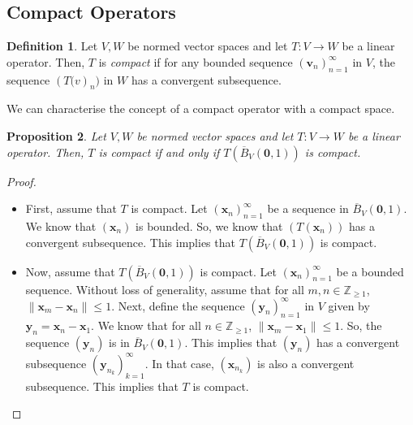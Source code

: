 \documentclass[a4paper, openany]{memoir}
\theoremstyle{definition}
\newtheorem{definition}{Definition}[section]
\theoremstyle{plain}
\newtheorem{proposition}[definition]{Proposition}
\begin{document}
    \subsection{Compact Operators}
    \begin{definition}
        Let $V, W$ be normed vector spaces and let $T: V \to W$ be a linear operator. Then, $T$ is \emph{compact} if for any bounded sequence $(\bm{v}_n)_{n=1}^\infty$ in $V$, the sequence $(T\bm(v)_n)$ in $W$ has a convergent subsequence.
    \end{definition}
    \noindent We can characterise the concept of a compact operator with a compact space.
    \begin{proposition}
        Let $V, W$ be normed vector spaces and let $T: V \to W$ be a linear operator. Then, $T$ is compact if and only if $T(\overline{B}_V(\bm{0}, 1))$ is compact.
    \end{proposition}
    \begin{proof}
        \hspace*{0pt}
        \begin{itemize}
            \item First, assume that $T$ is compact. Let $(\bm{x}_n)_{n=1}^\infty$ be a sequence in $\overline{B}_V(\bm{0}, 1)$. We know that $(\bm{x}_n)$ is bounded. So, we know that $(T(\bm{x}_n))$ has a convergent subsequence. This implies that $T(\overline{B}_V(\bm{0}, 1))$ is compact.
            
            \item Now, assume that $T(\overline{B}_V(\bm{0}, 1))$ is compact. Let $(\bm{x}_n)_{n=1}^\infty$ be a bounded sequence. Without loss of generality, assume that for all $m, n \in \mathbb{Z}_{\geq 1}$, $\lVert \bm{x}_m - \bm{x}_n \rVert \leq 1$. Next, define the sequence $(\bm{y}_n)_{n=1}^\infty$ in $V$ given by $\bm{y}_n = \bm{x}_n - \bm{x}_1$. We know that for all $n \in \mathbb{Z}_{\geq 1}$, $\lVert \bm{x}_m - \bm{x}_1 \rVert \leq 1$. So, the sequence $(\bm{y}_n)$ is in $\overline{B}_V(\bm{0}, 1)$. This implies that $(\bm{y}_n)$ has a convergent subsequence $(\bm{y}_{n_k})_{k=1}^\infty$. In that case, $(\bm{x}_{n_k})$ is also a convergent subsequence. This implies that $T$ is compact.
        \end{itemize}
    \end{proof}
\end{document}
